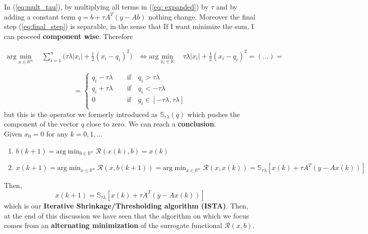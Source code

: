 In (\ref{eq:mult_tau}), by multiplying all terms in (\ref{eq: expanded}) by $\tau$ and by adding a constant term ${q= b+\tau A^T(y-Ab)}$ nothing change. Moreover the final step (\ref{eq:final_step}) is separable, in the sense that If I want minimize the sum, I can proceed \textbf{component wise}. Therefore

\begin{align}
     \textrm{arg}\min_{x \in \mathbb{R}^n} \quad 
    \sum_{i=1}^{n} \bigg(\tau\lambda \lvert x_i \rvert + \frac{1}{2} (x_i-q_i)^2 \bigg)
    &\Longleftrightarrow
     \textrm{arg}\min_{x_i \in \mathbb{R}} \quad
    \tau\lambda \lvert x_i \rvert + \frac{1}{2} (x_i-q_i)^2 = (...)=
\end{align}

\begin{equation}
    =\begin{cases}
        q_i-\tau\lambda &\quad \text{if}\quad q_i>\tau\lambda\\
        q_i+\tau\lambda\ &\quad \text{if}\quad q_i<-\tau\lambda\\
        0 &\quad \text{if}\quad q_i\in[-\tau\lambda, \tau\lambda]\\
    \end{cases}
\end{equation}
but this is the operator we formerly introduced as $\mathbb{S}_{\tau\lambda}(q)$ which pushes the component of the vector $q$ close to zero. We can reach a \textbf{conclusion}.\\
\noindent
Given $x_0=0$ for any $k=0,1,...$
\begin{enumerate}
    \item $b(k+1) =    \text{arg}\min_{b\in\mathbb{R}^n} \mathcal{R}(x(k),b)=x(k)$
    \item $x(k+1)=\text{arg}\min_{x\in\mathbb{R}^n} \mathcal{R}(x,b(k+1))=
    \text{arg}\min_{x\in\mathbb{R}^n} \mathcal{R}(x,x(k))=
    {\mathbb{S}_{\tau\lambda}[x(k)+\tau A^T(y-Ax(k))]}$
\end{enumerate}
Then, 
\begin{equation}\label{eq:ISTA_eq}
    x(k+1)={\mathbb{S}_{\tau\lambda}[x(k)+\tau A^T(y-Ax(k))]}
\end{equation}
which is our \textbf{Iterative Shrinkage/Thresholding algorithm (ISTA)}. Then, at the end of this discussion we have seen that the algorithm on which we focus comes from an \textbf{alternating minimization} of the surrogate functional $\mathcal{R}(x, b)$.\\

\hspace*{-5mm}


